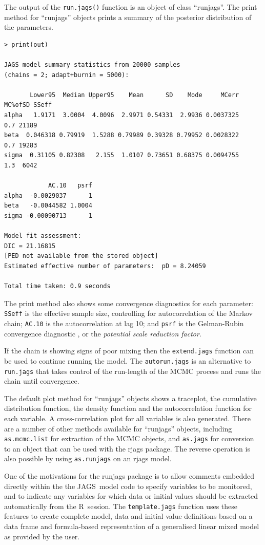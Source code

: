 \documentclass[11pt, a4paper, titlepage]{report}
\newcommand{\JAGS}{\textsf{JAGS}}
\newcommand{\R}{\textsf{R}}
\begin{document}
The output of the \texttt{run.jags()} function is an object of class
``runjags''. The print method for ``runjags'' objects prints a summary
of the posterior distribution of the parameters.
\begin{verbatim}
> print(out)

JAGS model summary statistics from 20000 samples 
(chains = 2; adapt+burnin = 5000):

       Lower95  Median Upper95    Mean      SD    Mode     MCerr MC%ofSD SSeff
alpha   1.9171  3.0004  4.0096  2.9971 0.54331  2.9936 0.0037325     0.7 21189
beta  0.046318 0.79919  1.5288 0.79989 0.39328 0.79952 0.0028322     0.7 19283
sigma  0.31105 0.82308   2.155  1.0107 0.73651 0.68375 0.0094755     1.3  6042

            AC.10   psrf
alpha  -0.0029037      1
beta   -0.0044582 1.0004
sigma -0.00090713      1

Model fit assessment:
DIC = 21.16815
[PED not available from the stored object]
Estimated effective number of parameters:  pD = 8.24059

Total time taken: 0.9 seconds
\end{verbatim}
The print method also shows some convergence diagnostics for each
parameter: \texttt{SSeff} is the effective sample size, controlling
for autocorrelation of the Markov chain; \texttt{AC.10} is the autocorrelation
at lag 10; and \texttt{psrf} is the Gelman-Rubin convergence diagnostic
\citep{GelmanRubin1992}, or the {\em potential scale reduction factor}.

If the chain is showing signs of poor mixing then the
\texttt{extend.jags} function can be used to continue running the
model. The \texttt{autorun.jags} is an alternative to
\texttt{run.jags} that takes control of the run-length of the MCMC
process and runs the chain until convergence.

The default plot method for ``runjags'' objects shows a traceplot, the
cumulative distribution function, the density function and the
autocorrelation function for each variable. A cross-correlation plot
for all variables is also generated.  There are a number of other 
methods available for ``runjags'' objects, including \texttt{as.mcmc.list} 
for extraction of the MCMC objects, and \texttt{as.jags} for conversion 
to an object that can be used with the rjags package.  The reverse 
operation is also possible by using \texttt{as.runjags} on an rjags model.  

One of the motivations for the runjags package is to allow comments
embedded directly within the the \JAGS\ model code to specify 
variables to be monitored, and to indicate any variables for which data 
or initial values should be extracted automatically from the \R\ session.  
The \texttt{template.jags} function uses these features to create 
complete model, data and initial value definitions based on a data
frame and formula-based representation of a generalised linear mixed 
model as provided by the user.
\end{document}
